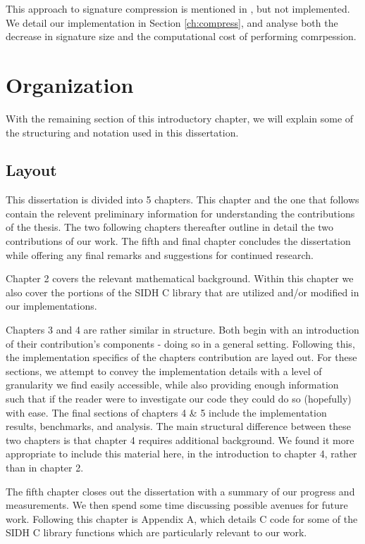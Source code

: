 This approach to signature compression is mentioned in \cite{yoo}, but not implemented. We detail our implementation in Section \ref{ch:compress}, and analyse both the decrease in signature size and the computational cost of performing comrpession. 

\section{Organization}

With the remaining section of this introductory chapter, we will explain some of the structuring and notation used in this dissertation.

\subsection{Layout}

This dissertation is divided into 5 chapters. This chapter and the one that follows contain the relevent preliminary information for understanding the contributions of the thesis. The two following chapters thereafter outline in detail the two contributions of our work. The fifth and final chapter concludes the dissertation while offering any final remarks and suggestions for continued research.

Chapter 2 covers the relevant mathematical background. Within this chapter we also cover the portions of the SIDH C library that are utilized and/or modified in our implementations.

Chapters 3 and 4 are rather similar in structure. Both begin with an introduction of their contribution's components - doing so in a general setting. Following this, the implementation specifics of the chapters contribution are layed out. For these sections, we attempt to convey the implementation details with a level of granularity we find easily accessible, while also providing enough information such that if the reader were to investigate our code they could do so (hopefully) with ease. The final sections of chapters 4 \& 5 include the implementation results, benchmarks, and analysis. The main structural difference between these two chapters is that chapter 4 requires additional background. We found it more appropriate to include this material here, in the introduction to chapter 4, rather than in chapter 2.

The fifth chapter closes out the dissertation with a summary of our progress and measurements. We then spend some time discussing possible avenues for future work. Following this chapter is Appendix A, which details C code for some of the SIDH C library functions which are particularly relevant to our work.

